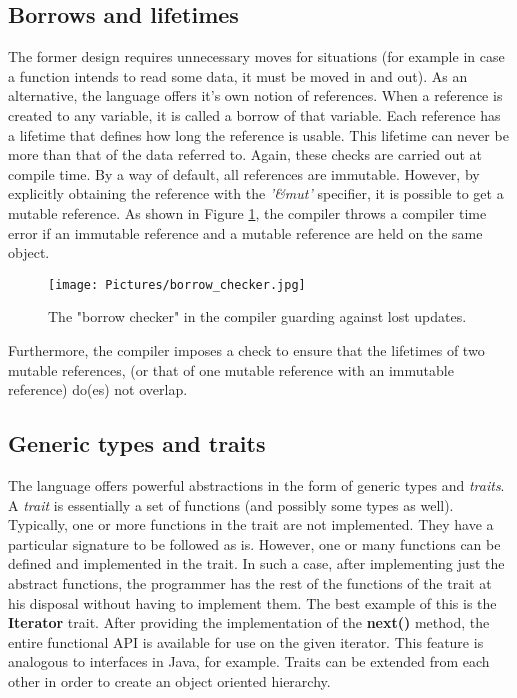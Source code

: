 \subsection{Borrows and lifetimes}
The former design requires unnecessary moves for situations (for example in case a function intends to read some data, it must be moved in and out). As an alternative, the language offers it's own notion of references. When a reference is created to any variable, it is called a borrow of that variable. Each reference has a lifetime that defines how long the reference is usable. This lifetime can never be more than that of the data referred to. Again, these checks are carried out at compile time. By a way of default, all references are immutable. However, by explicitly obtaining the reference with the \emph{'\&mut'} specifier, it is possible to get a mutable reference. As shown in Figure \ref{fig:borrow_checker}, the compiler throws a compiler time error if an immutable reference and a mutable reference are held on the same object.

\begin{figure}%
    \texttt{[image: Pictures/borrow\_checker.jpg]}
    \caption[Optimization]{The "borrow checker" in the compiler guarding against lost updates.}
	\label{fig:borrow_checker}
\end{figure}
Furthermore, the compiler imposes a check to ensure that the lifetimes of two mutable references, (or that of one mutable reference with an immutable reference) do(es) not overlap.

\subsection{Generic types and traits}
The language offers powerful abstractions in the form of generic types and \emph{traits}. A \emph{trait} is essentially a set of functions (and possibly some types as well). Typically, one or more functions in the trait are not implemented. They have a particular signature to be followed as is. However, one or many functions can be defined and implemented in the trait. In such a case, after implementing just the abstract functions, the programmer has the rest of the functions of the trait at his disposal without having to implement them. The best example of this is the \textbf{Iterator} trait. After providing the implementation of the \textbf{next()} method, the entire functional API is available for use on the given iterator. This feature is analogous to interfaces in Java, for example. Traits can be extended from each other in order to create an object oriented hierarchy.

